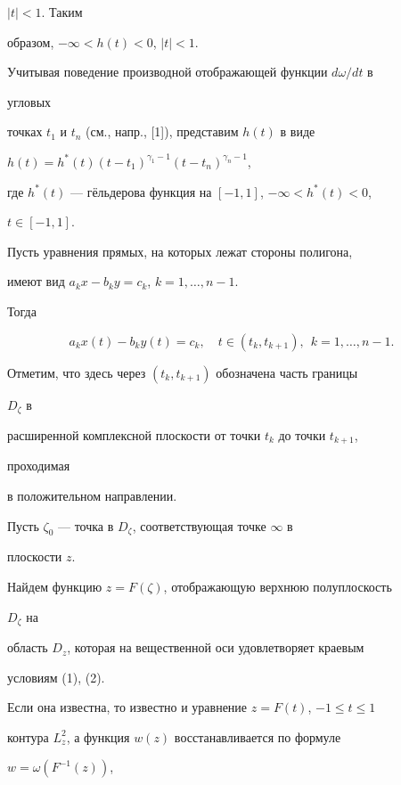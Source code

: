 $|t|<1$. Таким 


образом, $-\infty<h(t)<0$, $|t|<1$. 


 


Учитывая поведение производной отображающей функции $d\omega/dt$ в 


угловых 


точках $t_1$ и $t_n$ (см., напр., [1]), представим $h(t)$ в виде 


$h(t)=h^*(t)(t-t_1)^{\gamma_1-1}(t-t_n)^{\gamma_n-1}$, 


где $h^*(t)$ --- г\"ельдерова функция на $[-1,1]$, $-\infty<h^*(t)<0$, 


$t\in[-1,1]$. 


 


Пусть уравнения прямых, на которых лежат стороны полигона, 


имеют вид $a_k x-b_k y=c_k$, $k=1,\dotsc,n-1$. 


Тогда 


\begin{equation} 


a_k x(t)-b_k y(t)=c_k,\quad t\in(t_k,t_{k+1}),\ \ k=1,\dotsc,n-1. 


\end{equation} 


Отметим, что здесь через $(t_k,t_{k+1})$ обозначена часть границы 


$D_\zeta$ в 


расширенной комплексной плоскости от точки $t_k$ до точки $t_{k+1}$, 


проходимая 


в положительном направлении. 


 


Пусть $\zeta_0$ --- точка в $D_\zeta$, соответствующая точке $\infty$ в 


плоскости $z$. 


Найдем функцию $z=F(\zeta)$, отображающую верхнюю полуплоскость 


$D_\zeta$ на 


область $D_z$, которая на вещественной оси удовлетворяет краевым 


условиям (1), (2). 


Если она известна, то известно и уравнение $z=F(t)$, $-1\le t\le1$ 


контура $L^2_z$, а функция $w(z)$ восстанавливается по формуле 


$w=\omega(F^{-1}(z))$, 


